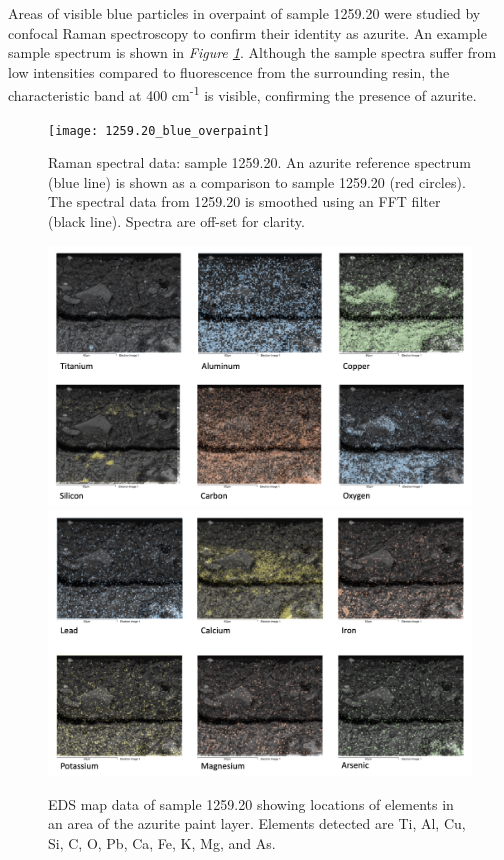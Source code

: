Areas of visible blue particles in overpaint of sample 1259.20 were studied by confocal Raman spectroscopy to confirm their identity as azurite. An example sample spectrum is shown in \textit{Figure \ref{fig:raman_1259-20}}. Although the sample spectra suffer from low intensities compared to fluorescence from the surrounding resin, the characteristic band at 400 cm\textsuperscript{-1} is visible, confirming the presence of azurite.

\begin{figure}[H] 
\centering
  \texttt{[image: 1259.20\_blue\_overpaint]}
\caption[Raman spectral data, 1259.20]{Raman spectral data: sample 1259.20. An azurite reference spectrum (blue line) is shown as a comparison to sample 1259.20 (red circles). The spectral data from 1259.20 is smoothed using an FFT filter (black line). Spectra are off-set for clarity.}
\label{fig:raman_1259-20}
\end{figure}

\begin{figure}[H]
\centering
\begin{minipage}[t]{\linewidth}
  \centering
  \includegraphics[width=0.9\linewidth]{1259.20_mapdata_1}
\hfill
\includegraphics[width=0.9\linewidth]{1259.20_mapdata_2}
\hfill
\end{minipage}
\caption[EDS map data, sample 1259.20.]{EDS map data of sample 1259.20 showing locations of elements in an area of the azurite paint layer. Elements detected are Ti, Al, Cu, Si, C, O, Pb, Ca, Fe, K, Mg, and As.}
\label{fig:1259.20_mapdata}
\end{figure}

